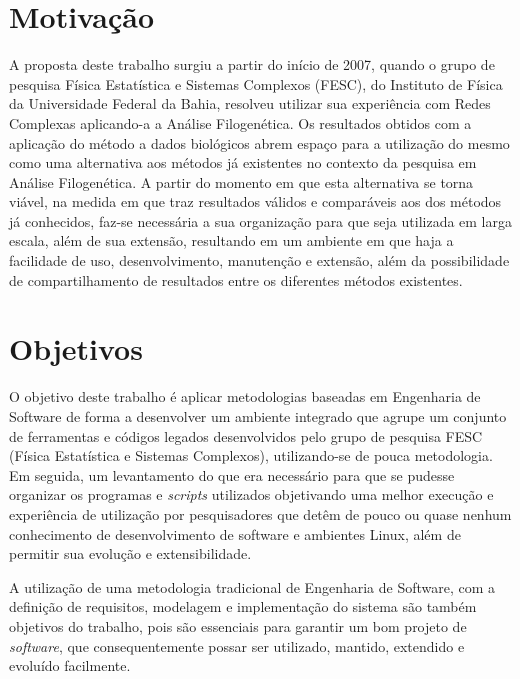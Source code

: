 \section{Motivação}

A proposta deste trabalho surgiu a partir do início de 2007, quando o grupo de pesquisa Física Estatística e Sistemas Complexos (FESC),
do Instituto de Física da Universidade Federal da Bahia, resolveu utilizar sua experiência com Redes Complexas aplicando-a a Análise Filogenética.
Os resultados obtidos com a aplicação do método a dados biológicos abrem espaço para a utilização do mesmo como uma alternativa aos métodos
já existentes no contexto da pesquisa em Análise Filogenética. A partir do momento em que esta alternativa se torna viável, na medida em que traz resultados
válidos e comparáveis aos dos métodos já conhecidos,
faz-se necessária a sua organização para que seja utilizada em larga escala, além de sua extensão,
resultando em um ambiente em que haja a facilidade de uso, desenvolvimento, manutenção e extensão, além da possibilidade de compartilhamento de
resultados entre os diferentes métodos existentes.

\section{Objetivos} \label{sec:objetivos}

O objetivo deste trabalho é aplicar metodologias baseadas em Engenharia de Software de forma a desenvolver um ambiente integrado que agrupe
um conjunto de ferramentas e códigos legados desenvolvidos pelo grupo de pesquisa FESC (Física Estatística e Sistemas Complexos),
utilizando-se de pouca metodologia. Em seguida, um levantamento do que era necessário para que
se pudesse organizar os programas e \textit{scripts} utilizados objetivando uma melhor execução e experiência de utilização por pesquisadores que detêm de
pouco ou quase nenhum conhecimento de desenvolvimento de software e ambientes Linux, além de permitir sua evolução e extensibilidade.

A utilização de uma metodologia tradicional de Engenharia de Software, com a definição de requisitos, modelagem e implementação do sistema são também
objetivos do trabalho, pois são
essenciais para garantir um bom projeto de \textit{software}, que consequentemente possar ser utilizado, mantido, extendido
e evoluído facilmente.


